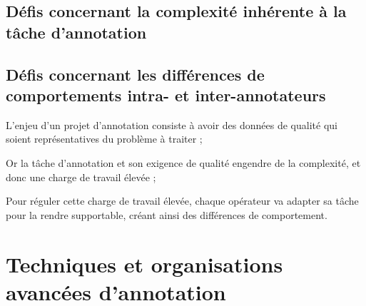 		
		\subsection{Défis concernant la complexité inhérente à la tâche d'annotation}
		\label{section:2.3.2-DEFIS-ANNOTATION-ASPECT-COMPLEXITE}
		
		
		\subsection{Défis concernant les différences de comportements intra- et inter-annotateurs}
		\label{section:2.3.3-DEFIS-ANNOTATION-ASPECT-HUMAIN}
		
		
		\begin{leftBarSummary}
			\begin{todolist}
				\item[\itemok] L'enjeu d'un projet d'annotation consiste à avoir des données de qualité qui soient représentatives du problème à traiter ;
				\item[\itemok] Or la tâche d'annotation et son exigence de qualité engendre de la complexité, et donc une charge de travail élevée ;
				\item[\itemok] Pour réguler cette charge de travail élevée, chaque opérateur va adapter sa tâche pour la rendre supportable, créant ainsi des différences de comportement.
			\end{todolist}
		\end{leftBarSummary}
	
	
    \section{Techniques et organisations avancées d'annotation}
	\label{section:2.4-AVANCEES-ANNOTATION}
		
